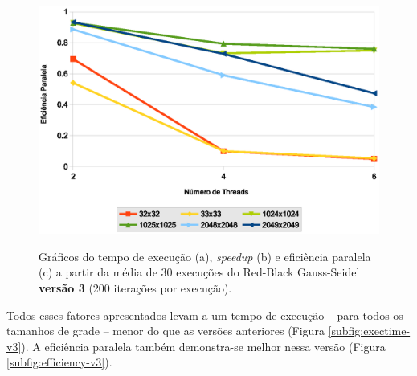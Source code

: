 \begin{figure}[H]
    \begin{minipage}{.5\textwidth}
        \includegraphics[width=\textwidth]{figures/efficiency-v3}
        \label{subfig:efficiency-v3}
    \end{minipage}%

    \caption{Gráficos do tempo de execução (a), \textit{speedup} (b) e eficiência paralela (c) a partir da média de 30 execuções do Red-Black Gauss-Seidel \textbf{versão 3} (200 iterações por execução).}
    \label{fig:perf-v3}
\end{figure}

Todos esses fatores apresentados levam a um tempo de execução -- para todos os tamanhos de grade -- menor do que as versões anteriores (Figura \ref{subfig:exectime-v3}). A eficiência paralela também demonstra-se melhor nessa versão (Figura \ref{subfig:efficiency-v3}).